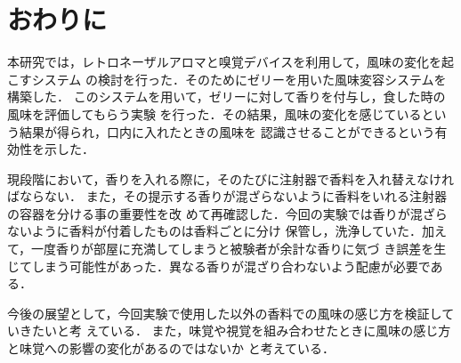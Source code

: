 \section{おわりに}

本研究では，レトロネーザルアロマと嗅覚デバイスを利用して，風味の変化を起こすシステム
の検討を行った．そのためにゼリーを用いた風味変容システムを構築した．
このシステムを用いて，ゼリーに対して香りを付与し，食した時の風味を評価してもらう実験
を行った．その結果，風味の変化を感じているという結果が得られ，口内に入れたときの風味を
認識させることができるという有効性を示した．


現段階において，香りを入れる際に，そのたびに注射器で香料を入れ替えなければならない．
また，その提示する香りが混ざらないように香料をいれる注射器の容器を分ける事の重要性を改
めて再確認した．今回の実験では香りが混ざらないように香料が付着したものは香料ごとに分け
保管し，洗浄していた．加えて，一度香りが部屋に充満してしまうと被験者が余計な香りに気づ
き誤差を生じてしまう可能性があった．異なる香りが混ざり合わないよう配慮が必要である．


今後の展望として，今回実験で使用した以外の香料での風味の感じ方を検証していきたいと考
えている．
また，味覚や視覚を組み合わせたときに風味の感じ方と味覚への影響の変化があるのではないか
と考えている．
